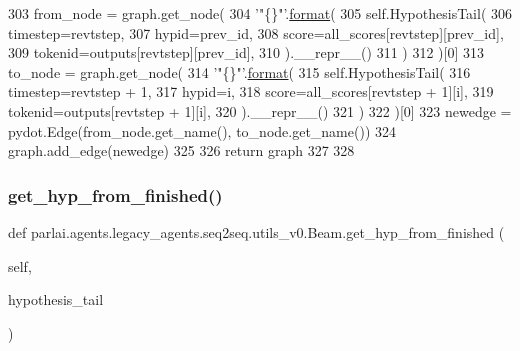 \begin{DoxyCode}
303                 from\_node = graph.get\_node(
304                     \textcolor{stringliteral}{'"\{\}"'}.\hyperlink{namespaceparlai_1_1chat__service_1_1services_1_1messenger_1_1shared__utils_a32e2e2022b824fbaf80c747160b52a76}{format}(
305                         self.HypothesisTail(
306                             timestep=revtstep,
307                             hypid=prev\_id,
308                             score=all\_scores[revtstep][prev\_id],
309                             tokenid=outputs[revtstep][prev\_id],
310                         ).\_\_repr\_\_()
311                     )
312                 )[0]
313                 to\_node = graph.get\_node(
314                     \textcolor{stringliteral}{'"\{\}"'}.\hyperlink{namespaceparlai_1_1chat__service_1_1services_1_1messenger_1_1shared__utils_a32e2e2022b824fbaf80c747160b52a76}{format}(
315                         self.HypothesisTail(
316                             timestep=revtstep + 1,
317                             hypid=i,
318                             score=all\_scores[revtstep + 1][i],
319                             tokenid=outputs[revtstep + 1][i],
320                         ).\_\_repr\_\_()
321                     )
322                 )[0]
323                 newedge = pydot.Edge(from\_node.get\_name(), to\_node.get\_name())
324                 graph.add\_edge(newedge)
325 
326         \textcolor{keywordflow}{return} graph
327 
328 
\end{DoxyCode}
\mbox{\label{classparlai_1_1agents_1_1legacy__agents_1_1seq2seq_1_1utils__v0_1_1Beam_a2df9b1e26c3f35c7149e4d7ae75c2f03}} 
\subsubsection{\texorpdfstring{get\+\_\+hyp\+\_\+from\+\_\+finished()}{get\_hyp\_from\_finished()}}
{\footnotesize\ttfamily def parlai.\+agents.\+legacy\+\_\+agents.\+seq2seq.\+utils\+\_\+v0.\+Beam.\+get\+\_\+hyp\+\_\+from\+\_\+finished (\begin{DoxyParamCaption}\item[{}]{self,  }\item[{}]{hypothesis\+\_\+tail }\end{DoxyParamCaption})}

